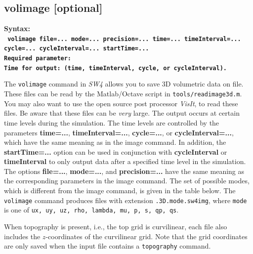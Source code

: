 \documentclass[11pt]{report}
\begin{document}
\subsection{volimage [optional]}
\label{keyword:volimage}
\begin{flushleft}
\bf Syntax:\\ \tt 
volimage file=... mode=... precision=... 
         time=... timeInterval=... cycle=... cycleInterval=... startTime=... \\
\bf Required parameter:\\
\rm Time for output: (time, timeInterval, cycle, or cycleInterval).
\end{flushleft}
%
The \verb+volimage+ command in \emph{SW4} allows you to save 3D volumetric data on file. These files
can be read by the Matlab/Octave script in \verb+tools/readimage3d.m+. You may also want to use the
open source post processor \emph{VisIt}, to read these files. Be aware that these files can be {\em
  very} large. The output occurs at certain time levels during the simulation. The time levels are
controlled by the parameters {\bf time=...}, {\bf timeInterval=...}, {\bf cycle=...}, or {\bf
  cycleInterval=...}, which have the same meaning as in the image command. In addition, the {\bf
  startTime=...} option can be used in conjunction with {\bf cycleInterval} or {\bf timeInterval} to
only output data after a specified time level in the simulation. The options {\bf file=...}, {\bf
  mode=...}, and {\bf precision=...} have the same meaning as the corresponding parameters in the
image command. The set of possible modes, which is different from the image command, is given in the
table below. The \verb+volimage+ command produces files with extension \verb+.3D.mode.sw4img+, where
\verb+mode+ is one of \verb+ux, uy, uz, rho, lambda, mu, p, s, qp, qs+.

When topography is present, i.e., the top grid is curvilinear, each file also includes the
$z$-coordinates of the curvilinear grid. Note that the grid coordinates are only saved when the
input file contains a \verb+topography+ command.
\end{document}
